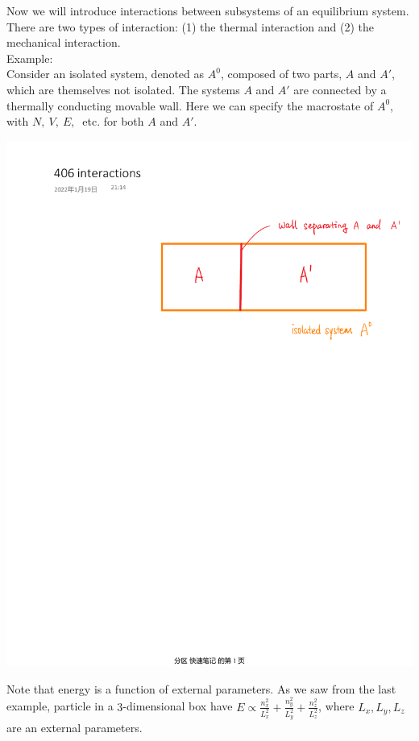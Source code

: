 \documentclass[11pt]{article}
\theoremstyle{break}
\theoremstyle{break}
\newcommand{\example}{\color{green}Example: \color{black}}
\begin{document}
\newpage

Now we will introduce interactions between subsystems of an equilibrium system. \\There are two types of interaction: (1) the thermal interaction and (2) the mechanical interaction. \\

\example\\
Consider an isolated system, denoted as $A^0$, composed of two parts, $A$ and $A'$, which are themselves not isolated. The systems $A$ and $A'$ are connected by a thermally conducting movable wall. Here we can specify the macrostate of $A^0$, with $N,\ V,\ E,\ $ etc. for both $A$ and $A'$. \\
\begin{center}
\includegraphics[scale=0.5]{interaction.pdf}
\end{center}

Note that energy is a function of external parameters. As we saw from the last example, particle in a $3$-dimensional box have $E\propto \frac{n_x^2}{L_x^2} +\frac{n_y^2}{L_y^2}+ \frac{n_z^2}{L_z^2}$, where $L_x, L_y, L_z$ are an external parameters. \\
\end{document}
